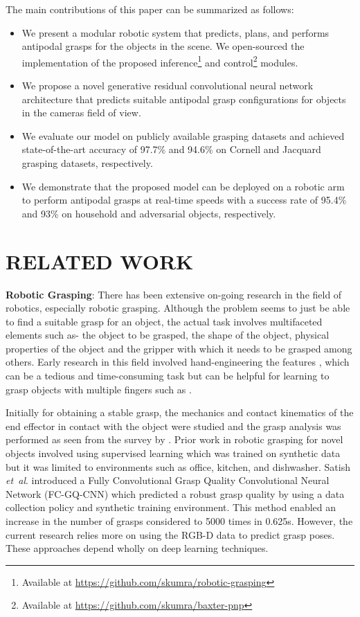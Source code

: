 \documentclass[letterpaper, 10 pt, conference]{ieeeconf}
\newcommand{\etal}{\textit{et~al}. }
\begin{document}
The main contributions of this paper can be summarized as follows: 
\begin{itemize}
    \item We present a modular robotic system that predicts, plans, and performs antipodal grasps for the objects in the scene. We open-sourced the implementation of the proposed inference\footnote{Available at \href{https://github.com/skumra/robotic-grasping}{https://github.com/skumra/robotic-grasping}} and control\footnote{Available at \href{https://github.com/skumra/baxter-pnp}{https://github.com/skumra/baxter-pnp}} modules.
    \item We propose a novel generative residual convolutional neural network architecture that predicts suitable antipodal grasp configurations for objects in the camera\textquotesingle s field of view.
    \item We evaluate our model on publicly available grasping datasets and achieved state-of-the-art accuracy of 97.7\% and 94.6\% on Cornell and Jacquard grasping datasets, respectively.
    \item We demonstrate that the proposed model can be deployed on a robotic arm to perform antipodal grasps at real-time speeds with a success rate of 95.4\% and 93\% on household and adversarial objects, respectively.
\end{itemize}



\section{RELATED WORK}
\textbf{Robotic Grasping}: There has been extensive on-going research in the field of robotics, especially robotic grasping. Although the problem seems to just be able to find a suitable grasp for an object, the actual task involves multifaceted elements such as- the object to be grasped, the shape of the object, physical properties of the object and the gripper with which it needs to be grasped among others. Early research in this field involved hand-engineering the features \cite{maitin2010cloth,kragic2003robust}, which can be a tedious and time-consuming task but can be helpful for learning to grasp objects with multiple fingers such as \cite{kopicki2016one,bohg2013data}. 

Initially for obtaining a stable grasp, the mechanics and contact kinematics of the end effector in contact with the object were studied and the grasp analysis was performed as seen from the survey by \cite{bicchi2000robotic,shimoga1996robot}. Prior work \cite{saxena2008robotic} in robotic grasping for novel objects involved using supervised learning which was trained on synthetic data but it was limited to environments such as office, kitchen, and dishwasher. Satish \etal \cite{satish2019policy} introduced a Fully Convolutional Grasp Quality Convolutional Neural Network (FC-GQ-CNN) which predicted a robust grasp quality by using a data collection policy and synthetic training environment. This method enabled an increase in the number of grasps considered to 5000 times in 0.625s.
However, the current research relies more on using the RGB-D data to predict grasp poses. These approaches depend wholly on deep learning techniques.
\end{document}
